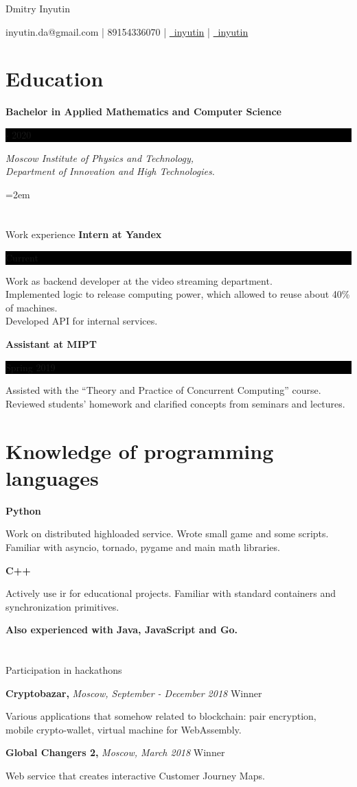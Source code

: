 \documentclass[fontsize=11pt]{article}
\newcommand{\sepspace}{\vspace*{1em}}   %
\newcommand{\MyName}[1]{ %
    \Huge \centering #1
    \par \normalsize \normalfont}
\newcommand{\NewPart}[1]{\section*{#1}}
\newcommand{\ProgrammingEntry}[2]{
    \noindent \textbf{#1} \hfill      %

    \noindent \small #2 %
    \normalsize \par}
\newcommand{\EducationEntry}[4]{
    \noindent \textbf{#1} \hfill      %
    \colorbox{Black}{
      \parbox{10em}{
      \color{White} \centering #2}} \par   %
    \noindent \textit{#3} \par        %
    \noindent\hangindent=2em\hangafter=0 \small #4 %
    \normalsize \par}
\newcommand{\WorkEntry}[3]{       %
    \noindent \large \textbf{#1} \hfill      %
    \colorbox{Black}{%
      \parbox{10em}{%
      \color{White} \centering #2}} \par  %
    \noindent \small #3 %
    \normalsize \par}
\newcommand{\AwardEntry}[4]{         %
    \noindent \textbf{#1} \noindent \textit{#3} \hfill {#2} \par
    \noindent \small #4 %
    \normalsize \par}
\begin{document}
\begin{minipage}{17cm}\raggedright
\MyName{Dmitry Inyutin}
{inyutin.da@gmail.com | 89154336070 | \href{https://t.me/inyutin}{\faTelegram \, inyutin} | \href{https://github.com/inyutin}{\faGithub \, inyutin}}
\end{minipage}



\NewPart{Education}{}
\EducationEntry
{Bachelor in Applied Mathematics and Computer Science}
{2016 - 2020}
{Moscow Institute of Physics and Technology, \\
 Department of Innovation and High Technologies.}

\NewPart{Work experience}{}
\WorkEntry
{Intern at Yandex}
{Current}
{Work as backend developer at the video streaming department.\\  Implemented logic to release computing power, which allowed to reuse about 40\% of machines. \\ Developed API for internal services. }

\bigskip

\WorkEntry
{Assistant at MIPT}
{Spring 2019}
{Assisted with the “Theory and Practice of Concurrent Computing” course. \\
 Reviewed students’ homework and clarified concepts from seminars and lectures.}

\NewPart{Knowledge of programming languages}{}
\ProgrammingEntry
{\textbf Python}
{Work on distributed highloaded service.
Wrote small game and some scripts. \\ Familiar with asyncio, tornado, pygame and main math libraries.}
\bigskip
\ProgrammingEntry
{C++}
{Actively use ir for educational projects. Familiar with standard containers and synchronization primitives.}
\bigskip

\ProgrammingEntry
{Also experienced with Java, JavaScript and Go.}

\NewPart{Participation in hackathons}{}

\AwardEntry{Cryptobazar, }{Winner}
{Moscow, September - December 2018}
{Various applications that somehow related to blockchain: pair encryption, \\ mobile crypto-wallet, virtual machine for WebAssembly.}
\sepspace
\AwardEntry{Global Changers 2,}{Winner}
{Moscow, March 2018}
{Web service that creates interactive Customer Journey Maps.}
\end{document}
